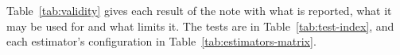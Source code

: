 Table~\ref{tab:validity} gives each result of the note with what is reported, what it may be used for and what limits it. The tests are in Table~\ref{tab:test-index}, and each estimator's configuration in Table~\ref{tab:estimators-matrix}.

